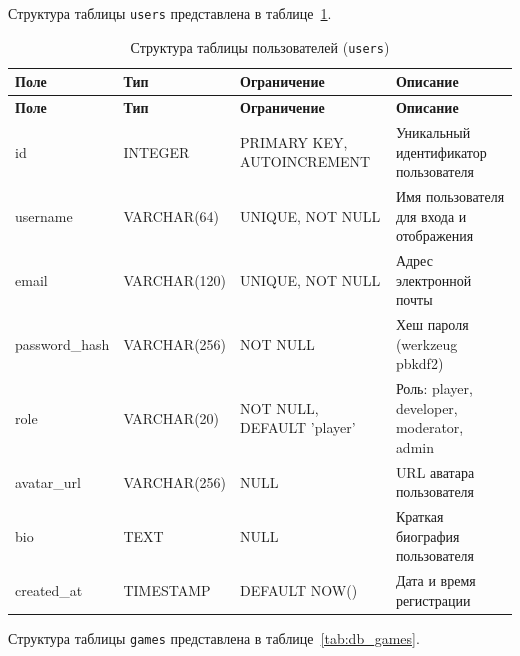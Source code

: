 Структура таблицы \texttt{users} представлена в таблице~\ref{tab:db_users}.

\begin{longtable}{|l|l|p{3.5cm}|p{5.5cm}|}
    \caption{Структура таблицы пользователей (\texttt{users})}
    \label{tab:db_users} \\
    \hline
    \textbf{Поле} & \textbf{Тип} & \textbf{Ограничение} & \textbf{Описание} \\ \hline
    \endfirsthead
    \tabcont{\ref{tab:db_users}}
    \textbf{Поле} & \textbf{Тип} & \textbf{Ограничение} & \textbf{Описание} \\ \hline
    \endhead
    \hline
    \endfoot
    \hline
    \endlastfoot
    id            & INTEGER      & PRIMARY KEY, AUTOINCREMENT & Уникальный идентификатор пользователя \\ \hline
    username      & VARCHAR(64)  & UNIQUE, NOT NULL        & Имя пользователя для входа и отображения \\ \hline
    email         & VARCHAR(120) & UNIQUE, NOT NULL        & Адрес электронной почты \\ \hline
    password\_hash & VARCHAR(256) & NOT NULL              & Хеш пароля (werkzeug pbkdf2) \\ \hline
    role          & VARCHAR(20)  & NOT NULL, DEFAULT 'player' & Роль: player, developer, moderator, admin \\ \hline
    avatar\_url   & VARCHAR(256) & NULL                    & URL аватара пользователя \\ \hline
    bio           & TEXT         & NULL                    & Краткая биография пользователя \\ \hline
    created\_at   & TIMESTAMP    & DEFAULT NOW()           & Дата и время регистрации \\ \hline
\end{longtable}

Структура таблицы \texttt{games} представлена в таблице~\ref{tab:db_games}.


